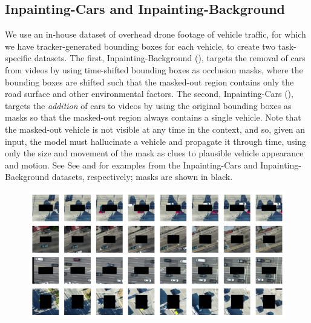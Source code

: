 \subsection{Inpainting-Cars and Inpainting-Background}
We use an in-house dataset of overhead drone footage of vehicle traffic, for which we have tracker-generated bounding boxes for each vehicle, to create two task-specific datasets. The first, Inpainting-Background (), targets the removal of cars from videos by using time-shifted bounding boxes as occlusion masks, where the bounding boxes are shifted such that the masked-out region contains only the road surface and other environmental factors. The second, Inpainting-Cars (), targets the \emph{addition} of cars to videos by using the original bounding boxes as masks so that the masked-out region always contains a single vehicle. Note that the masked-out vehicle is not visible at any time in the context, and so,  given an input, the model must hallucinate a vehicle and propagate it through time, using only the size and movement of the mask as clues to plausible vehicle appearance and motion. See See  and  for examples from the Inpainting-Cars and Inpainting-Background datasets, respectively; masks are shown in black.
\begin{figure}[t]
    \begin{center}
        \centering
        \captionsetup{type=figure}
        \includegraphics[width=\linewidth]{figures/dataset-examples/cars-examples.pdf}
        \label{fig:cars-examples}
    \end{center}
\end{figure}
